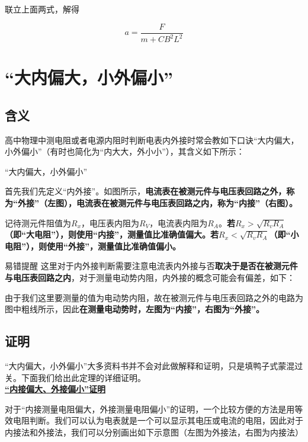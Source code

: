 联立上面两式，解得

\begin{equation}
\boxed{a = \frac{F}{m + C B^2 L^2}}
\end{equation}

\section{“大内偏大，小外偏小”}

\subsection{含义}
高中物理中测电阻或者电源内阻时判断电表内外接时常会教如下口诀“大内偏大，小外偏小”（有时也简化为“内大大，外小小”），其含义如下所示：

\begin{theo}{“大内偏大，小外偏小”}{}



首先我们先定义“内外接”。如图所示，\textbf{电流表在被测元件与电压表回路之外，称为“外接”（左图），电流表在被测元件与电压表回路之内，称为“内接”（右图）。}

记待测元件阻值为$R_x$，电压表内阻为$R_V$，电流表内阻为$R_A$。\textbf{若$R_x > \sqrt{R_v R_A}$（即“大电阻”），则使用“内接”，测量值比准确值偏大。若$R_x < \sqrt{R_v R_A}$（即“小电阻”），则使用“外接”，测量值比准确值偏小。}

\end{theo}

\begin{mk}{易错提醒}{}
这里对于内外接判断需要注意电流表内外接与否\textbf{取决于是否在被测元件与电压表回路之内}，对于测量电动势内阻，内外接的概念可能会有偏差，如下：



由于我们这里要测量的值为电动势内阻，故在被测元件与电压表回路之外的电路为图中粗线所示，因此\textbf{在测量电动势时，左图为“内接”，右图为“外接”。}
\end{mk}

\subsection{证明}
“大内偏大，小外偏小”大多资料书并不会对此做解释和证明，只是填鸭子式蒙混过关。下面我们给出此定理的详细证明。
~\\

\noindent \uline{\textbf{“内接偏大、外接偏小”证明}}

对于“内接测量电阻偏大，外接测量电阻偏小”的证明，一个比较方便的方法是用等效电阻判断。我们可以认为电表就是一个可以显示其电压或电流的电阻，因此对于内接法和外接法，我们可以分别画出如下示意图（左图为外接法，右图为内接法）

